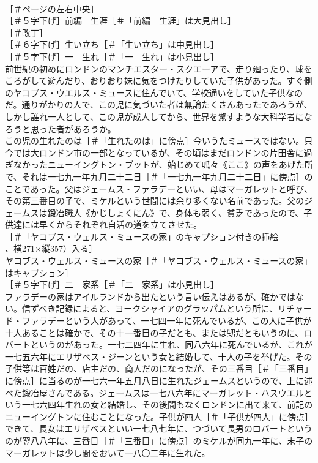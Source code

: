 \documentclass[8pt]{extreport}
\begin{document}
\begin{CJK}{UTF8}{min}
\\	［＃ページの左右中央］
\\	［＃５字下げ］前編　生涯［＃「前編　生涯」は大見出し］
\\	［＃改丁］
\\	［＃６字下げ］生い立ち［＃「生い立ち」は中見出し］
\\	［＃５字下げ］一　生れ［＃「一　生れ」は小見出し］
\\	前世紀の初めにロンドンのマンチエスター・スクエーアで、走り廻ったり、球をころがして遊んだり、おりおり妹に気をつけたりしていた子供があった。すぐ側のヤコブス・ウエルス・ミュースに住んでいて、学校通いをしていた子供なのだ。通りがかりの人で、この児に気づいた者は無論たくさんあったであろうが、しかし誰れ一人として、この児が成人してから、世界を驚すような大科学者になろうと思った者があろうか。
\\	この児の生れたのは［＃「生れたのは」に傍点］今いうたミュースではない。只今では大ロンドン市の一部となっているが、その頃はまだロンドンの片田舎に過ぎなかったニューイングトン・ブットが、始じめて呱々《ここ》の声をあげた所で、それは一七九一年九月二十二日［＃「一七九一年九月二十二日」に傍点］のことであった。父はジェームス・ファラデーといい、母はマーガレットと呼び、その第三番目の子で、ミケルという世間には余り多くない名前であった。父のジェームスは鍛冶職人《かじしょくにん》で、身体も弱く、貧乏であったので、子供達には早くからそれぞれ自活の道を立てさせた。
\\	［＃「ヤコブス・ウェルス・ミュースの家」のキャプション付きの挿絵
\\	、横271×縦357）入る］
\\	ヤコブス・ウェルス・ミュースの家［＃「ヤコブス・ウェルス・ミュースの家」はキャプション］ 
\\	［＃５字下げ］二　家系［＃「二　家系」は小見出し］
\\	ファラデーの家はアイルランドから出たという言い伝えはあるが、確かではない。信ずべき記録によると、ヨークシャイアのグラッパムという所に、リチャード・ファラデーという人があって、一七四一年に死んでいるが、この人に子供が十人あることは確かで、その十一番目の子だとも、または甥だともいうのに、ロバートというのがあった。一七二四年に生れ、同八六年に死んでいるが、これが一七五六年にエリザベス・ジーンという女と結婚して、十人の子を挙げた。その子供等は百姓だの、店主だの、商人だのになったが、その三番目［＃「三番目」に傍点］に当るのが一七六一年五月八日に生れたジェームスというので、上に述べた鍛冶屋さんである。ジェームスは一七八六年にマーガレット・ハスウエルという一七六四年生れの女と結婚し、その後間もなくロンドンに出て来て、前記のニューイングトンに住むことになった。子供が四人［＃「子供が四人」に傍点］できて、長女はエリザベスといい一七八七年に、つづいて長男のロバートというのが翌八八年に、三番目［＃「三番目」に傍点］のミケルが同九一年に、末子のマーガレットは少し間をおいて一八〇二年に生れた。

\end{CJK}
\end{document}
